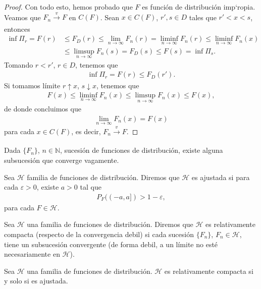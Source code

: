 \begin{proof}
    Con todo esto, hemos probado que $F$ es función de distribución imp`ropia. Veamos que $F_n \xrightarrow[]{v} F$ en $C(F)$. Sean $x \in C(F)$, $r',s \in D$ tales que $r' < x < s$, entonces
    \begin{align*}
        \inf \Pi_r =  F(r) & \leq F_D(r) \leq \lim_{n \to \infty} F_n(r) = \liminf_{n \to \infty} F_n(r) \leq \liminf_{n \to \infty} F_n(x) \\
                           & \leq \limsup_{n \to \infty} F_n(s) = F_D(s) \leq F(s) = \inf \Pi_s.
    \end{align*}
    Tomando $r < r'$, $r \in D$, tenemos que
    \begin{align*}
        \inf \Pi_r = F(r) \leq F_D(r').
    \end{align*}
    Si tomamos límite $r \uparrow x$, $s \downarrow x$, tenemos que
    \begin{align*}
        F(x) \leq \liminf_{n \to \infty} F_n(x) \leq \limsup_{n \to \infty} F_n(x) \leq F(x),
    \end{align*}
    de donde concluimos que
    \begin{align*}
        \lim_{n \to \infty} F_n(x) = F(x)
    \end{align*}
    para cada $x \in C(F)$, es decir, $F_n \xrightarrow[]{v} F$.
\end{proof}

\begin{teo}
    Dada $\{F_n\}$, $n \in \mathbb{N}$, sucesión de funciones de distribución, existe alguna subsucesión que converge vagamente.
\end{teo}

\begin{defi}
    Sea $\mathcal{H}$ familia de funciones de distribución. Diremos que $\mathcal{H}$ es ajustada si para cada $\varepsilon > 0$, existe $a > 0$ tal que
    \begin{align*}
        P_F((-a,a]) > 1 - \varepsilon,
    \end{align*}
    para cada $F \in \mathcal{H}$.
\end{defi}

\begin{defi}
    Sea $\mathcal{H}$ una familia de funciones de distribución. Diremos que $\mathcal{H}$ es relativamente compacta (respecto de la convergencia debil) si cada sucesión $\{F_n\}$, $F_n \in \mathcal{H}$, tiene un subsucesión convergente (de forma debil, a un límite no esté necesariamente en $\mathcal{H}$).
\end{defi}

\begin{teo}[Prokhorov]
    Sea $\mathcal{H}$ una familia de funciones de distribución. $\mathcal{H}$ es relativamente compacta si y solo si es ajustada.
\end{teo}